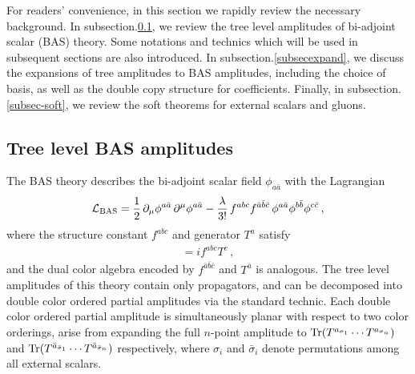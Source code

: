 \documentclass[11pt,a4paper]{article}
\newcommand{\bea}{\begin{eqnarray}}
\newcommand{\eea}{\end{eqnarray}}
\def\Tr{\mathop{\rm Tr}}
\begin{document}
For readers' convenience, in this section we rapidly review the necessary background. In subsection.\ref{subsecBAS}, we review the tree level amplitudes of bi-adjoint scalar (BAS) theory. Some notations and technics which will be used in subsequent sections are also introduced. In subsection.\ref{subsecexpand}, we discuss the expansions of tree amplitudes to BAS amplitudes, including the choice of basis, as well as the double copy structure for coefficients. Finally, in subsection.\ref{subsec-soft}, we review the soft theorems for external scalars and gluons.

\subsection{Tree level BAS amplitudes}
\label{subsecBAS}

The BAS theory describes the bi-adjoint scalar field $\phi_{a\bar{a}}$ with the Lagrangian
%
\bea
{\cal L}_{\rm BAS}={1\over2}\,\partial_\mu\phi^{a\bar{a}}\,\partial^{\mu}\phi^{a\bar{a}}-{\lambda\over3!}\,f^{abc}f^{\bar{a}\bar{b}\bar{c}}\,
\phi^{a\bar{a}}\phi^{b\bar{b}}\phi^{c\bar{c}}\,,
\eea
%
where the structure constant $f^{abc}$ and generator $T^a$ satisfy
%
\bea
[T^a,T^b]=if^{abc}T^c\,,
\eea
%
and the dual color algebra encoded by $f^{\bar{a}\bar{b}\bar{c}}$ and $T^{\bar{a}}$ is analogous.
The tree level amplitudes of this theory contain only propagators, and can be decomposed into double color ordered partial amplitudes via the standard technic.
Each double color ordered partial amplitude is simultaneously planar with respect to two color orderings, arise from expanding the full $n$-point amplitude to $\Tr(T^{a_{\sigma_1}}\cdots T^{a_{\sigma_n}})$ and $\Tr(T^{\bar{a}_{\bar{\sigma}_1}}\cdots T^{\bar{a}_{\bar{\sigma}_n}})$ respectively,
where $\sigma_i$ and $\bar{\sigma}_i$ denote permutations among all external scalars.
\end{document}
